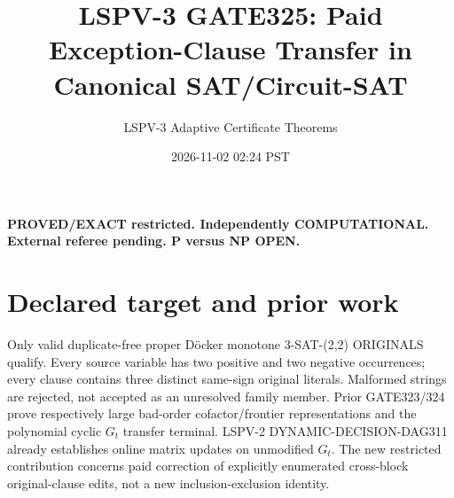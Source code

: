 \documentclass[11pt]{article}
\title{LSPV-3 GATE325: Paid Exception-Clause Transfer in Canonical SAT/Circuit-SAT}
\author{LSPV-3 Adaptive Certificate Theorems}
\date{2026-11-02 02:24 PST}
\begin{document}
\maketitle
\noindent\textbf{PROVED/EXACT restricted. Independently COMPUTATIONAL. External referee pending. P versus NP OPEN.}
\section{Declared target and prior work}
Only valid duplicate-free proper D\"ocker monotone 3-SAT-(2,2) ORIGINALS qualify. Every source variable has two positive and two negative occurrences; every clause contains three distinct same-sign original literals. Malformed strings are rejected, not accepted as an unresolved family member. Prior GATE323/324 prove respectively large bad-order cofactor/frontier representations and the polynomial cyclic $G_t$ transfer terminal. LSPV-2 DYNAMIC-DECISION-DAG311 already establishes online matrix updates on unmodified $G_t$. The new restricted contribution concerns paid correction of explicitly enumerated cross-block original-clause edits, not a new inclusion-exclusion identity.
\end{document}
